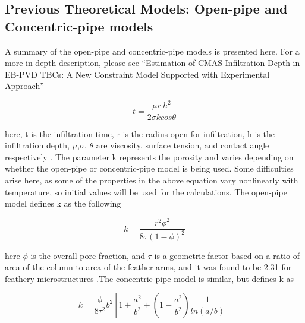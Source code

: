 \documentclass{UCF_ETD}
\begin{document}

\subsection{Previous Theoretical Models: Open-pipe and Concentric-pipe models}
\label{sec:RaviPipeModels}
A summary of the open-pipe and concentric-pipe models is presented here. For a more in-depth description, please see ``Estimation
of CMAS Infiltration Depth in EB-PVD TBCs: A New Constraint Model Supported with Experimental Approach''

\begin{equation}
    t=\frac{\mu r\ h^2}{2\sigma k cos\theta}
    \label{eq:PM_base}
\end{equation}

\noindent here, t is the infiltration time, r is the radius open for infiltration, h is the infiltration depth, $\mu$,$ \sigma$, $\theta$ are viscosity, surface tension, and contact angle respectively \cite{Naraparaju2017,ZHAO201474}. The parameter k represents the porosity and varies depending on whether the open-pipe or concentric-pipe model is being used. Some difficulties arise here, as some of the properties in the above equation vary nonlinearly with temperature, so initial values will be used for the calculations. The open-pipe model defines k as the following

\begin{equation}
    k=\frac{r^2\phi^2}{8\tau\left(1-\phi\right)^2}
    \label{eq:oPM}
\end{equation}

\noindent here $\phi$ is the overall pore fraction, and $\tau$ is a geometric factor based on a ratio of area of the column to area of the feather arms, and it was found to be 2.31 for feathery microstructures \cite{Naraparaju2019}.The concentric-pipe model is similar, but defines k as

\begin{equation}
    k=\frac{\phi}{8\tau^2}b^2\left[1+\frac{a^2}{b^2}+\left(1-\frac{a^2}{b^2}\right)\frac{1}{ln\left(a/b\right)}\right]
    \label{eq:CPM}
\end{equation}
\end{document}
